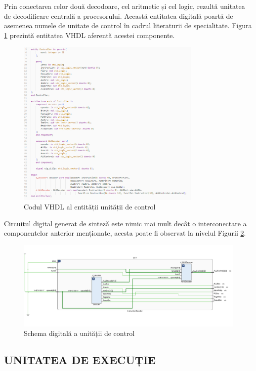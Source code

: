 \documentclass[12pt]{article}
\begin{document}
Prin conectarea celor două decodoare, cel aritmetic și cel logic, rezultă unitatea de decodificare centrală a procesorului. Această entitatea digitală poartă de asemenea numele de unitate de control în cadrul literaturii de specialitate. Figura \ref{Figura:48} prezintă entitatea VHDL aferentă acestei componente.

  \begin{figure}[h!]
 \includegraphics[width=0.8\textwidth]{controllervhdl.png}
 \centering
 \caption{Codul VHDL al entității unității de control}
 \label{Figura:48}
 \end{figure}
 
Circuitul digital generat de sinteză este nimic mai mult decât o interconectare a componentelor anterior menționate, acesta poate fi observat la nivelul Figurii \ref{Figura:49}. 
 
 \begin{figure}[h!]
 \includegraphics[width=1.05\textwidth]{controller.png}\centering
 \caption{Schema digitală a unității de control}
 \label{Figura:49}
 \end{figure}
 
\subsection{UNITATEA DE EXECUȚIE} 
\end{document}
